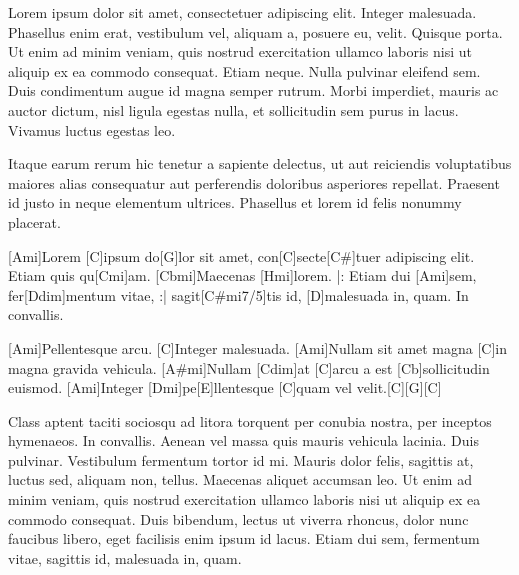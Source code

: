 

Lorem ipsum dolor sit amet, consectetuer adipiscing elit. Integer malesuada.
Phasellus enim erat, vestibulum vel, aliquam a, posuere eu, velit. Quisque porta.
Ut enim ad minim veniam, quis nostrud exercitation ullamco laboris 
nisi ut aliquip ex ea commodo consequat. Etiam neque. Nulla pulvinar eleifend sem. 
Duis condimentum augue id magna semper rutrum. Morbi imperdiet, mauris ac auctor 
dictum, nisl ligula egestas nulla, et sollicitudin sem purus in lacus. Vivamus 
luctus egestas leo.

Itaque earum rerum hic tenetur a sapiente delectus, ut aut reiciendis voluptatibus 
maiores alias consequatur aut perferendis doloribus asperiores repellat. Praesent 
id justo in neque elementum ultrices. Phasellus et lorem id felis nonummy placerat.

\guitarOn
\strophe{}[Ami]Lorem [C]ipsum do[G]lor sit amet,
con[C]secte[C#]tuer adipiscing elit.
Etiam quis qu[Cmi]am. [Cbmi]Maecenas [Hmi]lorem.
|: Etiam dui [Ami]sem, fer[Ddim]mentum vitae, :|
sagit[C#mi7/5]tis id, [D]malesuada in, quam. In convallis.

[Ami]Pellentesque arcu. [C]Integer malesuada.
[Ami]Nullam sit amet magna [C]in magna gravida vehicula.
[A#mi]Nullam [Cdim]at [C]arcu a est [Cb]sollicitudin euismod.
[Ami]Integer [Dmi]pe[E]llentesque [C]quam vel velit.[C][G][C]
\guitarOff

Class aptent taciti sociosqu ad litora torquent per conubia nostra, per inceptos 
hymenaeos. In convallis. Aenean vel massa quis mauris vehicula lacinia. Duis 
pulvinar. Vestibulum fermentum tortor id mi. Mauris dolor felis, sagittis at, 
luctus sed, aliquam non, tellus. Maecenas aliquet accumsan leo. Ut enim ad minim 
veniam, quis nostrud exercitation ullamco laboris nisi ut aliquip ex ea commodo 
consequat. Duis bibendum, lectus ut viverra rhoncus, dolor nunc faucibus libero, 
eget facilisis enim ipsum id lacus. Etiam dui sem, fermentum vitae, sagittis id, 
malesuada in, quam. 

\bye
